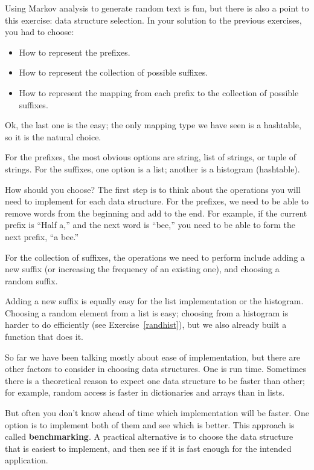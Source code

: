 \documentclass[10pt]{book}
\begin{document}
Using Markov analysis to generate random text is fun, but there is
also a point to this exercise: data structure selection.  In your
solution to the previous exercises, you had to choose:

\begin{itemize}

\item How to represent the prefixes.

\item How to represent the collection of possible suffixes.

\item How to represent the mapping from each prefix to
the collection of possible suffixes.

\end{itemize}

Ok, the last one is the easy; the only mapping type we have
seen is a hashtable, so it is the natural choice.

For the prefixes, the most obvious options are string,
list of strings, or tuple of strings.  For the suffixes,
one option is a list; another is a histogram (hashtable).


How should you choose?  The first step is to think about
the operations you will need to implement for each data structure.
For the prefixes, we need to be able to remove words from
the beginning and add to the end.  For example, if the current
prefix is ``Half a,'' and the next word is ``bee,'' you need
to be able to form the next prefix, ``a bee.''

For the collection of suffixes, the operations we need to
perform include adding a new suffix (or increasing the frequency
of an existing one), and choosing a random suffix.

Adding a new suffix is equally easy for the list implementation
or the histogram.  Choosing a random element from a list
is easy; choosing from a histogram is harder to do
efficiently (see Exercise~\ref{randhist}), but we also already built 
a function that does it.

So far we have been talking mostly about ease of implementation,
but there are other factors to consider in choosing data structures.
One is run time.  Sometimes there is a theoretical reason to expect
one data structure to be faster than other; for example, random access 
is faster in dictionaries and arrays than in lists.

But often you don't know ahead of time which implementation will
be faster.  One option is to implement both of them and see which
is better.  This approach is called {\bf benchmarking}.  A practical
alternative is to choose the data structure that is
easiest to implement, and then see if it is fast enough for the
intended application.  %
\end{document}
